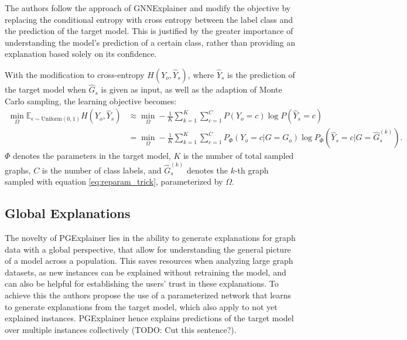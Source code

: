 The authors follow the approach of GNNExplainer \cite{ying2019gnnexplainer} and modify the objective by replacing the conditional entropy with cross entropy between the label class and the prediction of the target model. This is justified by the greater importance of understanding the model's prediction of a certain class, rather than providing an explanation based solely on its confidence.

With the modification to cross-entropy $H(Y_o, \hat{Y}_s)$, where $\hat{Y}_s$ is the prediction of the target model when $\hat{G}_s$ is given as input, as well as the adaption of Monte Carlo sampling, the learning objective becomes:
\begin{equation}
    \label{eq:monte_carlo}
    \begin{aligned}
        \min_\Omega\mathbb{E}_{\epsilon\sim\text{Uniform}(0,1)}H(Y_o, \hat{Y}_s) &\approx \min_\Omega -\frac{1}{K}\sum_{k=1}^K\sum_{c=1}^C P(Y_o = c) \log P(\hat{Y}_s = c) \\
        &= \min_\Omega -\frac{1}{K}\sum_{k=1}^K\sum_{c=1}^C P_\Phi (Y_o = c|G = G_o) \log P_\Phi(\hat{Y}_s = c|G=\hat{G}_s^{(k)}).
    \end{aligned}
    \end{equation}
$\Phi$ denotes the parameters in the target model, $K$ is the number of total sampled graphs, $C$ is the number of class labels, and $\hat{G}_s^{(k)}$ denotes the $k$-th graph sampled with equation \ref{eq:reparam_trick}, parameterized by $\Omega$. %





\subsection{Global Explanations}
\label{sec:Global_Explanations}
The novelty of PGExplainer lies in the ability to generate explanations for graph data with a global perspective, that allow for understanding the general picture of a model across a population. This saves resources when analyzing large graph datasets, as new instances can be explained without retraining the model, and can also be helpful for establishing the users' trust in these explanations. To achieve this the authors propose the use of a parameterized network that learns to generate explanations from the target model, which also apply to not yet explained instances. PGExplainer hence explains predictions of the target model over multiple instances collectively (TODO: Cut this sentence?).

